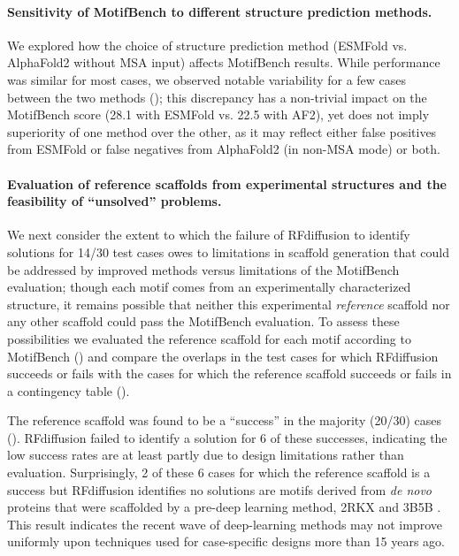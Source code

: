 \paragraph{Sensitivity of MotifBench to different structure prediction methods.} We explored how the choice of structure prediction method (ESMFold vs. AlphaFold2 without MSA input) affects MotifBench results. While performance was similar for most cases, we observed notable variability for a few cases between the two methods (); this discrepancy has a non-trivial impact on the MotifBench score (28.1 with ESMFold vs. 22.5 with AF2), yet does not imply superiority of one method over the other, as it may reflect either false positives from ESMFold or false negatives from AlphaFold2 (in non-MSA mode) or both.

\paragraph{Evaluation of reference scaffolds from experimental structures and the feasibility of ``unsolved'' problems.}
We next consider the extent to which the failure of RFdiffusion to identify solutions for 14/30 test cases owes to limitations in scaffold generation that could be addressed by improved methods versus limitations of the MotifBench evaluation; though each motif comes from an experimentally characterized structure, it remains possible that neither this experimental \emph{reference} scaffold nor any other scaffold could pass the MotifBench evaluation.  To assess these possibilities we evaluated the reference scaffold for each motif according to MotifBench () and compare the overlaps in the test cases for which RFdiffusion succeeds or fails with the cases for which the reference scaffold succeeds or fails in a contingency table ().

The reference scaffold was found to be a ``success'' in the majority (20/30) cases ().  RFdiffusion failed to identify a solution for 6 of these successes, indicating the low success rates are at least partly due to design limitations rather than evaluation. Surprisingly, 2 of these 6 cases for which the reference scaffold is a success but RFdiffusion identifies no solutions are motifs derived from \textit{de novo} proteins that were scaffolded by a pre-deep learning method, 2RKX \citep{rothlisberger2008kemp} and 3B5B \citep{jiang2008novo}.  This result indicates the recent wave of deep-learning methods may not improve uniformly upon techniques used for case-specific designs more than 15 years ago.  

